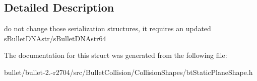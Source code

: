 \subsection{Detailed Description}
do not change those serialization structures, it requires an updated s\+Bullet\+D\+N\+Astr/s\+Bullet\+D\+N\+Astr64 

The documentation for this struct was generated from the following file\+:\begin{DoxyCompactItemize}
\item 
bullet/bullet-\/2.-\/r2704/src/\+Bullet\+Collision/\+Collision\+Shapes/bt\+Static\+Plane\+Shape.\+h\end{DoxyCompactItemize}
